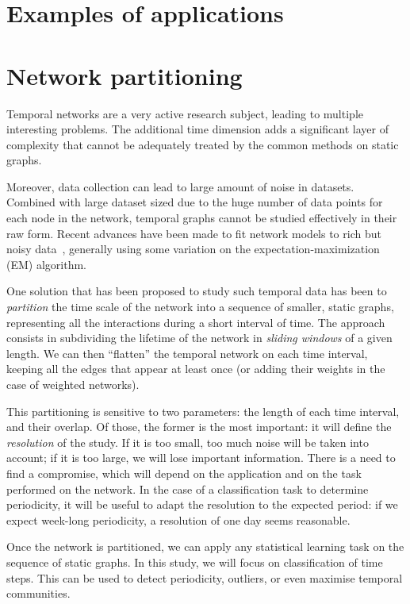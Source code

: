 \documentclass[a4paper,11pt,openany,extrafontsizes]{memoir}
\begin{document}
\section{Examples of applications}%
\label{sec:exampl-appl}


\section{Network partitioning}%
\label{sec:network-partitioning}

Temporal networks are a very active research subject, leading to
multiple interesting problems. The additional time dimension adds a
significant layer of complexity that cannot be adequately treated by
the common methods on static graphs.

Moreover, data collection can lead to large amount of noise in
datasets. Combined with large dataset sized due to the huge number of
data points for each node in the network, temporal graphs cannot be
studied effectively in their raw form. Recent advances have been made
to fit network models to rich but noisy
data~\cite{newman_network_2018}, generally using some variation on the
expectation-maximization (EM) algorithm.

One solution that has been proposed to study such temporal data has
been to \emph{partition} the time scale of the network into a sequence
of smaller, static graphs, representing all the interactions during a
short interval of time. The approach consists in subdividing the
lifetime of the network in \emph{sliding windows} of a given length.
We can then ``flatten'' the temporal network on each time interval,
keeping all the edges that appear at least once (or adding their
weights in the case of weighted networks).

This partitioning is sensitive to two parameters: the length of each
time interval, and their overlap. Of those, the former is the most
important: it will define the \emph{resolution} of the study. If it is
too small, too much noise will be taken into account; if it is too
large, we will lose important information. There is a need to find a
compromise, which will depend on the application and on the task
performed on the network. In the case of a classification task to
determine periodicity, it will be useful to adapt the resolution to
the expected period: if we expect week-long periodicity, a resolution
of one day seems reasonable.

Once the network is partitioned, we can apply any statistical learning
task on the sequence of static graphs. In this study, we will focus on
classification of time steps. This can be used to detect periodicity,
outliers, or even maximise temporal communities.
\end{document}
